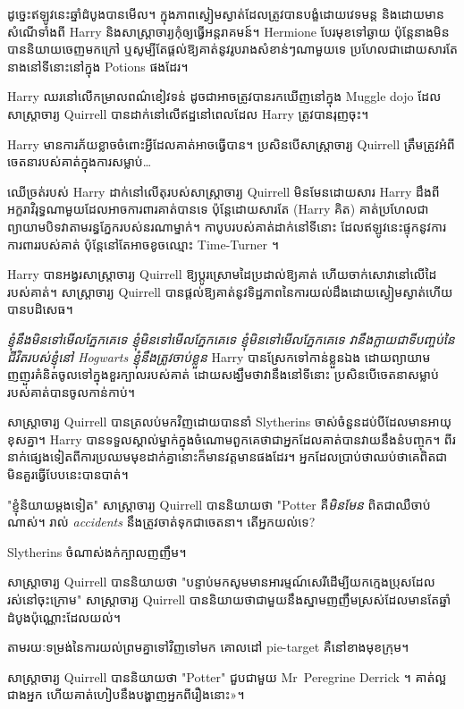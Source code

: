 {{{{{ដូច្នេះឥឡូវនេះឆ្នាំដំបូងបានមើល។ ក្នុង​ភាព​ស្ងៀមស្ងាត់​ដែល​ត្រូវ​បាន​បង្ខំ​ដោយ​វេទមន្ត និង​ដោយ​មាន​សំណើ​ទាំង​ពី Harry និង​សាស្ត្រាចារ្យ​កុំ​ឲ្យ​ធ្វើ​អន្តរាគមន៍។ Hermione បែរមុខទៅឆ្ងាយ ប៉ុន្តែនាងមិនបាននិយាយចេញមកក្រៅ ឬសូម្បីតែផ្តល់ឱ្យគាត់នូវរូបរាងសំខាន់ៗណាមួយទេ ប្រហែលជាដោយសារតែនាងនៅទីនោះនៅក្នុង Potions ផងដែរ។

Harry ឈរនៅលើកម្រាលពណ៌ខៀវទន់ ដូចជាអាចត្រូវបានរកឃើញនៅក្នុង Muggle dojo ដែលសាស្រ្តាចារ្យ Quirrell បានដាក់នៅលើឥដ្ឋនៅពេលដែល Harry ត្រូវបានរុញចុះ។

Harry មានការភ័យខ្លាចចំពោះអ្វីដែលគាត់អាចធ្វើបាន។ ប្រសិនបើសាស្រ្តាចារ្យ Quirrell ត្រឹមត្រូវអំពីចេតនារបស់គាត់ក្នុងការសម្លាប់…

ឈើច្រត់របស់ Harry ដាក់នៅលើតុរបស់សាស្រ្តាចារ្យ Quirrell មិនមែនដោយសារ Harry ដឹងពីអក្ខរាវិរុទ្ធណាមួយដែលអាចការពារគាត់បានទេ ប៉ុន្តែដោយសារតែ (Harry គិត) គាត់ប្រហែលជាព្យាយាមបិទវាតាមរន្ធភ្នែករបស់នរណាម្នាក់។ កាបូបរបស់គាត់ដាក់នៅទីនោះ ដែលឥឡូវនេះផ្ទុកនូវការការពាររបស់គាត់ ប៉ុន្តែនៅតែអាចខូចឈ្មោះ Time-Turner ។

Harry បាន​អង្វរ​សាស្ត្រាចារ្យ Quirrell ឱ្យ​ប្តូរ​ស្រោមដៃ​ប្រដាល់​ឱ្យ​គាត់ ហើយ​ចាក់សោ​វា​នៅលើ​ដៃ​របស់គាត់។ សាស្រ្តាចារ្យ Quirrell បានផ្តល់ឱ្យគាត់នូវទិដ្ឋភាពនៃការយល់ដឹងដោយស្ងៀមស្ងាត់ហើយបានបដិសេធ។

\emph{ខ្ញុំនឹងមិនទៅមើលភ្នែកគេទេ ខ្ញុំមិនទៅមើលភ្នែកគេទេ ខ្ញុំមិនទៅមើលភ្នែកគេទេ វានឹងក្លាយជាទីបញ្ចប់នៃជីវិតរបស់ខ្ញុំនៅ Hogwarts ខ្ញុំនឹងត្រូវចាប់ខ្លួន} Harry បានស្រែកទៅកាន់ខ្លួនឯង ដោយព្យាយាមញញួរគំនិតចូលទៅក្នុងខួរក្បាលរបស់គាត់ ដោយសង្ឃឹមថាវានឹងនៅទីនោះ ប្រសិនបើចេតនាសម្លាប់របស់គាត់បានចូលកាន់កាប់។

សាស្រ្តាចារ្យ Quirrell បានត្រលប់មកវិញដោយបាននាំ Slytherins ចាស់ចំនួនដប់បីដែលមានអាយុខុសគ្នា។ Harry បាន​ទទួល​ស្គាល់​ម្នាក់​ក្នុង​ចំណោម​ពួក​គេ​ថា​ជា​អ្នក​ដែល​គាត់​បាន​វាយ​នឹង​នំ​បញ្ចុក។ ពីរ​នាក់​ផ្សេង​ទៀត​ពី​ការ​ប្រឈម​មុខ​ដាក់​គ្នា​នោះ​ក៏​មាន​វត្តមាន​ផង​ដែរ​។ អ្នក​ដែល​ប្រាប់​ថា​ឈប់​ថា​គេ​ពិត​ជា​មិន​គួរ​ធ្វើ​បែប​នេះ​បាន​បាត់។

"ខ្ញុំនិយាយម្តងទៀត" សាស្រ្តាចារ្យ Quirrell បាននិយាយថា "Potter គឺ\emph{មិនមែន} ពិតជាឈឺចាប់ណាស់។ រាល់ \emph{accidents} នឹងត្រូវចាត់ទុកជាចេតនា។ តើអ្នកយល់ទេ?

Slytherins ចំណាស់ងក់ក្បាលញញឹម។

សាស្រ្តាចារ្យ Quirrell បាននិយាយថា "បន្ទាប់មកសូមមានអារម្មណ៍សេរីដើម្បីយកក្មេងប្រុសដែលរស់នៅចុះក្រោម" សាស្រ្តាចារ្យ Quirrell បាននិយាយថាជាមួយនឹងស្នាមញញឹមស្រស់ដែលមានតែឆ្នាំដំបូងប៉ុណ្ណោះដែលយល់។

តាមរយៈទម្រង់នៃការយល់ព្រមគ្នាទៅវិញទៅមក គោលដៅ pie-target គឺនៅខាងមុខក្រុម។

សាស្រ្តាចារ្យ Quirrell បាននិយាយថា "Potter" ជួបជាមួយ Mr~Peregrine Derrick ។ គាត់​ល្អ​ជាង​អ្នក ហើយ​គាត់​ហៀប​នឹង​បង្ហាញ​អ្នក​ពី​រឿង​នោះ»។

}}}}}
